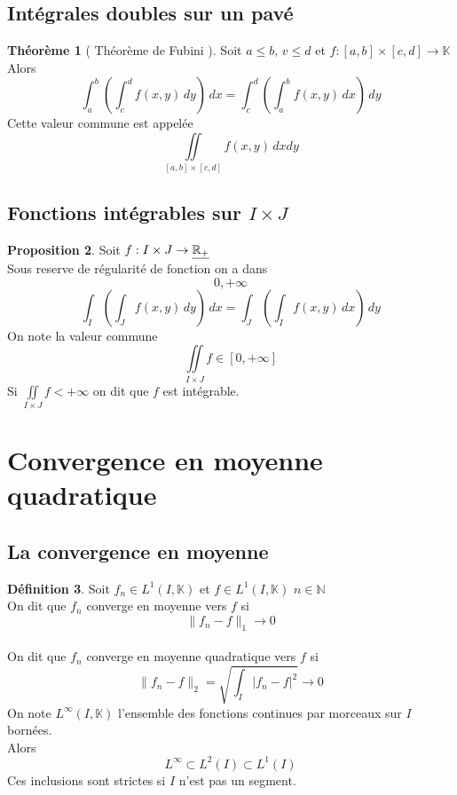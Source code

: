 \documentclass[10pt,a4paper]{article}
\theoremstyle{definition}
\newtheorem{proposition}{Proposition}[section]
\newtheorem{theorem}[proposition]{Théorème}
\newtheorem{definition}[proposition]{Définition}
\begin{document}
\subsection{Intégrales doubles sur un pavé}
\begin{theorem}[ Théorème de Fubini ]
    Soit \(a \leq b,\, v \leq d\) et \(f:[a, b] \times [c, d] \to \mathbb{K}\) \\
    Alors
    \[\int_{a}^{b} \left(\int_{c}^{d} f(x, y) \,dy\right) \,dx = \int_{c}^{d} \left(\int_{a}^{b} f(x, y) \,dx\right) \,dy\]
    Cette valeur commune est appelée
    \[\iint\limits_{[a, b] \times [c, d]}f(x, y) \, dx dy\]
\end{theorem}

\subsection{Fonctions intégrables sur \(I \times J\)}
\begin{proposition}
    Soit \(f: I \times J \to \uline{\mathbb{R}_+}\) \\
    Sous reserve de régularité de fonction on a dans \[0, +\infty\]
    \[\int_{I} \left(\int_{J} f(x, y) \,dy\right) \,dx = \int_{J} \left(\int_{I} f(x, y) \,dx\right) \,dy\]
    On note la valeur commune
    \[\iint\limits_{I \times J} f \in [0, +\infty]\]
    Si \(\iint\limits_{I \times J} f < +\infty\) on dit que \(f\) est intégrable.
\end{proposition}

\section{Convergence en moyenne quadratique}
\subsection{La convergence en moyenne}
\begin{definition}
    Soit \(f_n \in L^1(I, \mathbb{K})\) et \(f \in L^1(I, \mathbb{K})\) \(n \in \mathbb{N}\) \\
    On dit que \(f_n\) converge en moyenne vers \(f\) si \[\lVert f_n - f \rVert_1 \to 0\] \\
    On dit que \(f_n\) converge en moyenne quadratique vers \(f\) si \[\lVert f_n - f \rVert_2 = \sqrt{\int_{I}|f_n - f|^2} \to 0\]
    On note \(L^\infty(I, \mathbb{K})\) l'ensemble des fonctions continues par morceaux sur \(I\) bornées. \\
    Alors \[\boxed{L^\infty \subset L^2(I) \subset L^1(I)}\]
    Ces inclusions sont strictes si \(I\) n'est pas un segment.
\end{definition}
\end{document}

